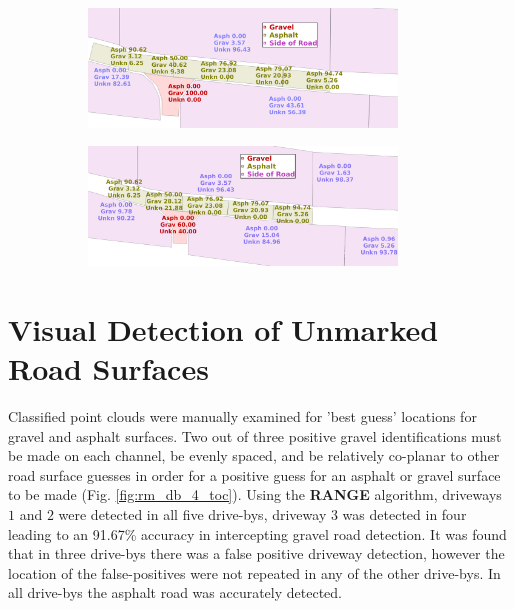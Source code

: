 \documentclass[numbered,pdftex]{ohio-etd}
\begin{document}
{{{%
		\begin{figure}[H]
			\centering
			\begin{subfigure}[b]{\textwidth}
				\centering
				\includegraphics[width=0.9\textwidth]{Defense_Images/range_actual_rm_db_4_area_score}
				\caption{}
				\label{fig:db_4_raw_range_2}
			\end{subfigure}
			\vspace{1cm} %
			\begin{subfigure}[b]{\textwidth}
				\centering
				\includegraphics[width=0.9\textwidth]{Defense_Images/dvg_example}
				\caption{}
				\label{fig:dvg_example}
			\end{subfigure}
			\caption[]{}
			\label{fig:area_score_comp}
		\end{figure}
		
		
	}
	
	
	\section{Visual Detection of Unmarked Road Surfaces}{
	
		
		{Classified point clouds were manually examined for 'best guess' locations for gravel and asphalt surfaces. Two out of three positive gravel identifications must be made on each channel, be evenly spaced, and be relatively co-planar to other road surface guesses in order for a positive guess for an asphalt or gravel surface to be made (Fig. \ref{fig:rm_db_4_toc}). Using the \textbf{RANGE} algorithm, driveways $1$ and $2$ were detected in all five drive-bys, driveway $3$ was detected in four leading to an 91.67\% accuracy in intercepting gravel road detection. It was found that in three drive-bys there was a false positive driveway detection, however the location of the false-positives were not repeated in any of the other drive-bys. In all drive-bys the asphalt road was accurately detected.}
		
}}}
\end{document}
